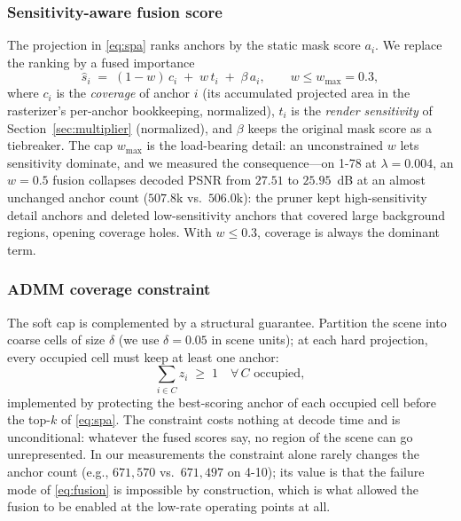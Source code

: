 \documentclass[conference]{IEEEtran}
\begin{document}
\subsubsection{Sensitivity-aware fusion score}
The projection in \eqref{eq:spa} ranks anchors by the static mask score $a_i$.
We replace the ranking by a fused importance
\begin{equation}
\hat{s}_i \;=\; (1-w)\,c_i \;+\; w\,t_i \;+\; \beta\, a_i ,
\qquad w \le w_{\max}=0.3,
\label{eq:fusion}
\end{equation}
where $c_i$ is the \emph{coverage} of anchor $i$ (its accumulated projected area in
the rasterizer's per-anchor bookkeeping, normalized), $t_i$ is the
\emph{render sensitivity} of Section~\ref{sec:multiplier} (normalized), and $\beta$
keeps the original mask score as a tiebreaker. The cap $w_{\max}$ is the load-bearing
detail: an unconstrained $w$ lets sensitivity dominate, and we measured the
consequence---on 1-78 at $\lambda{=}0.004$, an $w{=}0.5$ fusion collapses decoded
PSNR from $27.51$ to $25.95$~dB at an almost unchanged anchor count
($507.8$k vs.\ $506.0$k): the pruner kept high-sensitivity detail anchors and
deleted low-sensitivity anchors that covered large background regions, opening
coverage holes. With $w\le0.3$, coverage is always the dominant term.

\subsubsection{ADMM coverage constraint}
The soft cap is complemented by a structural guarantee. Partition the scene into
coarse cells of size $\delta$ (we use $\delta=0.05$ in scene units); at each hard
projection, every occupied cell must keep at least one anchor:
\begin{equation}
\sum_{i\in C} z_i \;\ge\; 1 \quad \forall\, C \text{ occupied},
\label{eq:cov}
\end{equation}
implemented by protecting the best-scoring anchor of each occupied cell before the
top-$k$ of \eqref{eq:spa}. The constraint costs nothing at decode time and is
unconditional: whatever the fused scores say, no region of the scene can go
unrepresented. In our measurements the constraint alone rarely changes the anchor
count (e.g., $671{,}570$ vs.\ $671{,}497$ on 4-10); its value is that the failure
mode of \eqref{eq:fusion} is impossible by construction, which is what allowed the
fusion to be enabled at the low-rate operating points at all.
\end{document}
